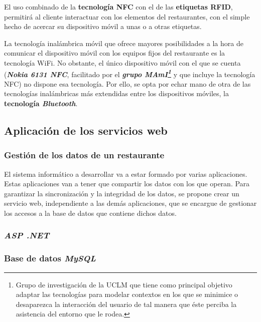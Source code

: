  El uso combinado de la \textbf{tecnología \acs{NFC}} con el de las
  \textbf{etiquetas \acs{RFID}}, permitirá al cliente interactuar con los
  elementos del restaurantes, con el simple hecho de acercar su dispositivo
  móvil a unas o a otras etiquetas.

  La tecnología inalámbrica móvil que ofrece mayores posibilidades a la hora
  de comunicar el dispositivo móvil con los equipos fijos del restaurante es
  la tecnología \acs{WiFi}. No obstante, el único dispositivo móvil con el que
  se cuenta (\emph{\textbf{Nokia 6131 \acs{NFC}}}, facilitado por el
  \textbf{\emph{grupo \acs{MAmI}\footnote{Grupo de investigación de la
  \acs{UCLM} que tiene como principal objetivo adaptar las tecnologías para 
  modelar contextos en los que se minimice o desaparezca la interacción del 
  usuario de tal manera que éste perciba la asistencia del entorno que le 
  rodea.}}} y que incluye la tecnología \acs{NFC}) no
  dispone esa tecnología. Por ello, se opta por echar mano de otra de las
  tecnologías inalámbricas más extendidas entre los dispositivos móviles, la
  \textbf{tecnología \emph{Bluetooth}}.

  \subsection{Aplicación de los servicios web}
    \subsubsection{Gestión de los datos de un restaurante}
  El sistema informático a desarrollar va a estar formado por varias
  aplicaciones. Estas aplicaciones van a tener que compartir los datos con
  los que operan. Para garantizar la sincronización y la integridad de los
  datos, se propone crear un servicio web, independiente a las demás
  aplicaciones, que se encargue de gestionar los accesos a la base de datos
  que contiene dichos datos.

    \subsubsection{\emph{ASP .NET}}

    \subsubsection{Base de datos \emph{MySQL}}

